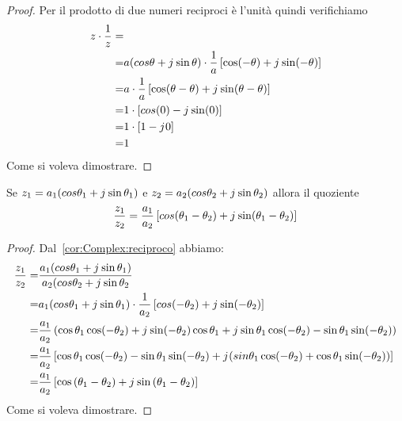 \begin{proof}
	Per il prodotto di due numeri reciproci è l'unità quindi verifichiamo 
\begin{align*}
z\cdot\dfrac{1}{z}=&\\
=&a(cos\theta+j\mkern1mu\sin\theta)\cdot\dfrac{1}{a}\left[\cos (-\theta)+j\mkern1mu\sin(-\theta)\right]\\
=&a\cdot\dfrac{1}{a}\left[\cos(\theta-\theta)+j\mkern1mu\sin(\theta-\theta)\right]\\
=&1\cdot\left[cos(0)-j\mkern1mu\sin(0)\right]\\
=&1\cdot\left[1-j\mkern1mu 0\right]\\
=&1
\end{align*}
Come si voleva dimostrare.
\end{proof}
\begin{thm}[Quoziente]
Se $z_1=a_1(cos\theta_1+j\mkern1mu\sin\theta_1)$ e $z_2=a_2(cos\theta_2+j\mkern1mu\sin\theta_2)$ allora il quoziente \[\dfrac{z_1}{z_2}=\dfrac{a_1}{a_2}\left[cos(\theta_1-\theta_2)+j\mkern1mu\sin(\theta_1-\theta_2)\right] \] 
\end{thm}
\begin{proof}
	Dal~\cref{cor:Complex:reciproco} abbiamo:
	\begin{align*}
	\dfrac{z_1}{z_2}=&\dfrac{a_1(cos\theta_1+j\mkern1mu\sin\theta_1)}{a_2(cos\theta_2+j\mkern1mu\sin\theta_2}\\
	=&a_1(cos\theta_1+j\mkern1mu\sin\theta_1)\cdot\dfrac{1}{a_2}\left[cos(-\theta_2)+j\mkern1mu\sin(-\theta_2) \right]\\
	=&\dfrac{a_1}{a_2}\left(\cos\theta_1\cos(-\theta_2)+j\mkern1mu\sin(-\theta_2)\cos\theta_1+j\mkern1mu\sin\theta_1\cos(-\theta_2)-\sin\theta_1\sin(-\theta_2)\right)\\
	=&\dfrac{a_1}{a_2}\left[\cos\theta_1\cos(-\theta_2)-\sin\theta_1\sin(-\theta_2)+j\mkern1mu(sin\theta_1\cos(-\theta_2)+\cos\theta_1\sin(-\theta_2))\right]\\
	=&\dfrac{a_1}{a_2}\left[\cos\left(\theta_1-\theta_2\right)+j\mkern1mu\sin\left(\theta_1-\theta_2\right)\right]
	\end{align*}
	Come si voleva dimostrare.
\end{proof}